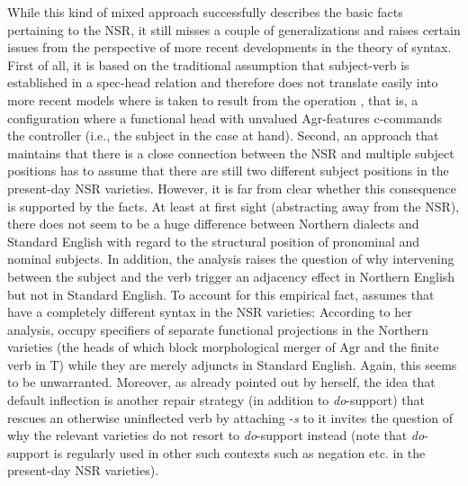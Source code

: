 \documentclass[output=paper]{langsci/langscibook}
\begin{document}
While this kind of mixed approach successfully describes the basic facts
pertaining to the \gls{NSR}, it still misses a couple of generalizations and
raises certain issues from the perspective of more recent developments in the
theory of syntax. First of all, it is based on the traditional assumption that
subject-verb  is established in a spec-head relation and therefore
does not translate easily into more recent models where  is taken to
result from the operation , that is, a configuration where a functional
head with unvalued Agr-features c-commands the  controller (i.e., the
subject in the case at hand). Second, an approach that maintains that there is
a close connection between the \gls{NSR} and multiple subject positions has to
assume that there are still two different subject positions in the present-day
\gls{NSR} varieties. However, it is far from clear whether this consequence is
supported by the facts. At least at first sight (abstracting away from the
\gls{NSR}), there does not seem to be a huge difference between Northern
dialects and Standard English with regard to the structural position of
pronominal and nominal subjects. In addition, the analysis raises the question
of why  intervening between the subject and the verb trigger an
adjacency effect in Northern English but not in Standard English. To account
for this empirical fact, \textcite{deHaas:2011} assumes that  have a
completely different syntax in the \gls{NSR} varieties: According to her
analysis,  occupy specifiers of separate functional projections in the
Northern varieties (the heads of which block morphological merger of Agr and
the finite verb in T) while they are merely adjuncts in Standard English.
Again, this seems to be unwarranted. Moreover, as already pointed out by
\textcite{deHaas:2011} herself, the idea that default inflection is another
repair strategy (in addition to \emph{do}-support) that rescues an otherwise
uninflected verb by attaching -\emph{s} to it invites the question of why the
relevant varieties do not resort to \emph{do}-support instead (note that
\emph{do}-support is regularly used in other such contexts such as negation
etc. in the present-day \gls{NSR} varieties).
\end{document}
